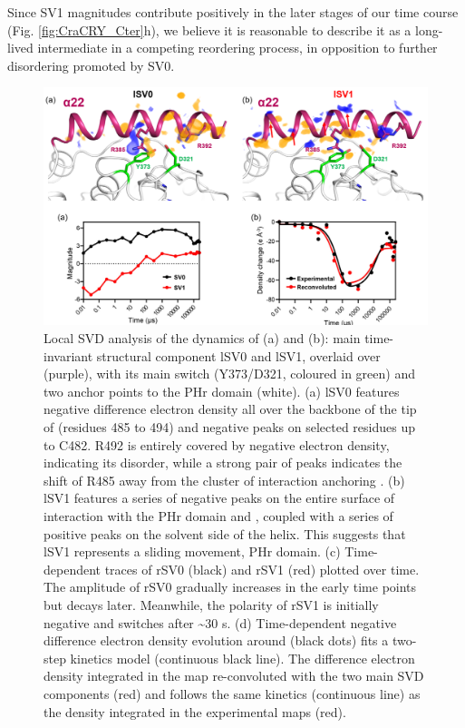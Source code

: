 Since SV1 magnitudes contribute positively in the later stages of our time course (Fig. \ref{fig:CraCRY_Cter}h), we believe it is reasonable to describe it as a long-lived intermediate in a competing reordering process, in opposition to further disordering promoted by SV0.
\begin{figure}[H]
  \centering
  \includegraphics[width=\textwidth]{images/cracry/CraCRY_C-terSVD.pdf}
  \hfill
  \caption{Local SVD analysis of the dynamics of  (a) and (b): main time-invariant structural component lSV0 and lSV1, overlaid over  (purple), with its main switch (Y373/D321, coloured in green) and two anchor points to the PHr domain (white). (a) lSV0 features negative difference electron density all over the backbone of the tip of  (residues 485 to 494) and negative peaks on selected residues up to C482. R492 is entirely covered by negative electron density, indicating its disorder, while a strong pair of peaks indicates the shift of R485 away from the cluster of interaction anchoring . (b) lSV1 features a series of negative peaks on the entire surface of interaction with the PHr domain and  , coupled with a series of positive peaks on the solvent side of the helix. This suggests that lSV1 represents a sliding movement, PHr domain. (c) Time-dependent traces of rSV0 (black) and rSV1 (red) plotted over time. The amplitude of rSV0 gradually increases in the early time points but decays later. Meanwhile, the polarity of rSV1 is initially negative and switches after \textasciitilde30 \textmu s. (d) Time-dependent negative difference electron density evolution around  (black dots) fits a two-step kinetics model (continuous black line). The difference electron density integrated in the map re-convoluted with the two main SVD components (red) and follows the same kinetics (continuous line) as the density integrated in the experimental maps (red). }\label{fig:CraCRY_Cter-SVD}
\end{figure}
